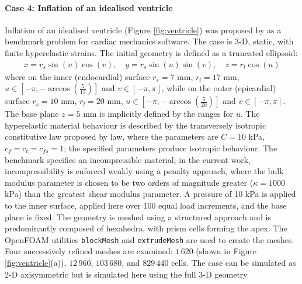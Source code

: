 \documentclass[sn-mathphys,Numbered]{sn-jnl}%
\begin{document}
\paragraph{Case 4: Inflation of an idealised ventricle}
Inflation of an idealised ventricle (Figure \ref{fig:ventricle}) was proposed by \citet{Land2015} as a benchmark problem for cardiac mechanics software.
The case is 3-D, static, with finite hyperelastic strains.
The initial geometry is defined as a truncated ellipsoid:
\begin{eqnarray}
	x = r_s \sin(u) \cos(v), \quad
	y = r_s \sin(u) \sin(v), \quad
	z = r_l \cos(u)
\end{eqnarray}
where on the inner (endocardial) surface $r_s =7$ mm, $r_l = 17$ mm, $u \in \left[-\pi, -\arccos \left( \frac{5}{17} \right) \right]$ and $v \in \left[-\pi, \pi \right]$, while on the outer (epicardial) surface $r_s =10$ mm, $r_l = 20$ mm, $u \in \left[-\pi, -\arccos \left( \frac{5}{20} \right) \right]$ and $v \in \left[-\pi, \pi \right]$.
The base plane $z = 5$ mm is implicitly defined by the ranges for $u$.
The hyperelastic material behaviour is described by the transversely isotropic constitutive law proposed by \citet{Guccione1995} law, where the parameters are $C = 10$ kPa, $c_f = c_t = c_{fs} = 1$; the specified parameters produce isotropic behaviour.
The benchmark specifies an incompressible material; in the current work, incompressibility is enforced weakly using a penalty approach, where the bulk modulus parameter is chosen to be two orders of magnitude greater ($\kappa = 1000$ kPa) than the greatest shear modulus parameter.
A pressure of 10 kPa is applied to the inner surface, applied here over 100 equal load increments, and the base plane is fixed.
The geometry is meshed using a structured approach and is predominantly composed of hexahedra, with prism cells forming the apex.
The OpenFOAM utilities \texttt{blockMesh} and \texttt{extrudeMesh} are used to create the meshes.
Four successively refined meshes are examined: $1\,620$ (shown in Figure \ref{fig:ventricle}(a)), $12\,960$, $103\,680$, and $829\,440$ cells.
The case can be simulated as 2-D axisymmetric but is simulated here using the full 3-D geometry.
\end{document}
